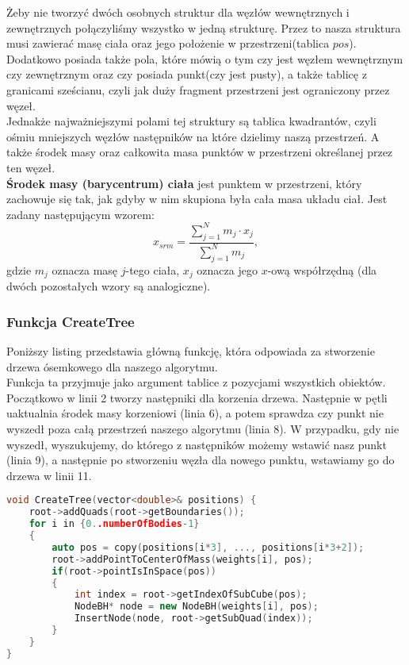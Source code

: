 \documentclass[14pt,twoside,a4paper]{article}
\theoremstyle{definition}
\begin{document}
Żeby nie tworzyć dwóch osobnych struktur dla węzłów wewnętrznych i zewnętrznych połączyliśmy wszystko w jedną strukturę. Przez to nasza struktura musi zawierać masę ciała oraz jego położenie w przestrzeni(tablica $pos$). Dodatkowo posiada także pola, które mówią o tym czy jest węzłem wewnętrznym czy zewnętrznym oraz czy posiada punkt(czy jest pusty), a także tablicę z granicami sześcianu, czyli jak duży fragment przestrzeni jest ograniczony przez węzeł.\\
\bigskip
Jednakże najważniejszymi polami tej struktury są tablica kwadrantów, czyli ośmiu mniejszych węzłów następników na które dzielimy naszą przestrzeń. A także środek masy oraz całkowita masa punktów w przestrzeni określanej przez ten węzeł. \\
\textbf{Środek masy (barycentrum) ciała}  jest punktem w przestrzeni, który zachowuje się tak, jak gdyby w nim skupiona była cała masa układu ciał. Jest zadany następującym wzorem:
$$ x_{srm} = \frac{\sum_{j=1}^N m_j\cdot x_j}{\sum_{j=1}^N m_j},$$ gdzie $m_j$ oznacza masę $j$-tego ciała, $x_j$ oznacza jego $x$-ową współrzędną (dla dwóch pozostałych wzory są analogiczne). \\

\subsubsection{\large Funkcja CreateTree}
Poniższy listing przedstawia główną funkcję, która odpowiada za stworzenie drzewa ósemkowego dla naszego algorytmu.\\ 
\bigskip
Funkcja ta przyjmuje jako argument tablice z pozycjami wszystkich obiektów. 
Początkowo w linii 2 tworzy następniki dla korzenia drzewa. Następnie w pętli uaktualnia środek masy korzeniowi (linia 6), a potem sprawdza czy punkt nie wyszedł poza całą przestrzeń naszego algorytmu (linia 8). W przypadku, gdy nie wyszedł, wyszukujemy, do którego z następników możemy wstawić nasz punkt (linia 9), a następnie po stworzeniu węzła dla nowego punktu, wstawiamy go do drzewa w linii 11.

\begin{lstlisting}[language=C++, frame=single, framerule=2pt, caption=Pseudokod algorytmu tworzenia drzewa ósemkowego]
void CreateTree(vector<double>& positions) {
    root->addQuads(root->getBoundaries());
    for i in {0..numberOfBodies-1}
    {	
    	auto pos = copy(positions[i*3], ..., positions[i*3+2]);	        
        root->addPointToCenterOfMass(weights[i], pos);
        if(root->pointIsInSpace(pos)) 
        {
            int index = root->getIndexOfSubCube(pos);
            NodeBH* node = new NodeBH(weights[i], pos);
            InsertNode(node, root->getSubQuad(index));
        }
    }
}
\end{lstlisting}
\end{document}
